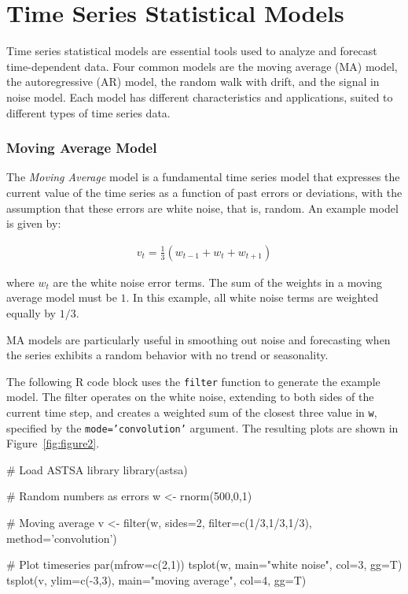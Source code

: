 \section{Time Series Statistical Models}

Time series statistical models are essential tools used to analyze and forecast time-dependent data. Four common models are the moving average (MA) model, the autoregressive (AR) model, the random walk with drift, and the signal in noise model. Each model has different characteristics and applications, suited to different types of time series data.

\subsubsection*{Moving Average Model}

The \emph{Moving Average} model is a fundamental time series model that expresses the current value of the time series as a function of past errors or deviations, with the assumption that these errors are white noise, that is, random. An example model is given by: 

\begin{align*}v_t = \frac{1}{3} ( w_{t-1} + w_t + w_{t+1})
\end{align*}

\noindent where $w_t$ are the white noise error terms. The sum of the weights in a moving average model must be $1$. In this example, all white noise terms are weighted equally by $1/3$.

MA models are particularly useful in smoothing out noise and forecasting when the series exhibits a random behavior with no trend or seasonality.

The following R code block uses the \texttt{filter} function to generate the example model. The filter operates on the white noise, extending to both sides of the current time step, and creates a weighted sum of the closest three value in \texttt{w}, specified by the \texttt{mode='convolution'} argument. The resulting plots are shown in Figure~\ref{fig:figure2}. 

\begin{Rcode}
# Load ASTSA library
library(astsa)

# Random numbers as errors
w <- rnorm(500,0,1)

# Moving average
v <- filter(w, sides=2, filter=c(1/3,1/3,1/3), method='convolution')

# Plot timeseries
par(mfrow=c(2,1))
tsplot(w, main="white noise", col=3, gg=T)
tsplot(v, ylim=c(-3,3), main="moving average", col=4, gg=T)
\end{Rcode}

